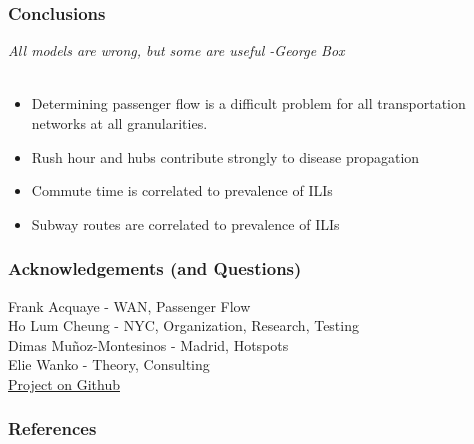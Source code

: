 \documentclass{beamer}
\begin{document}
\begin{frame}
\frametitle{Conclusions}
\textit{All models are wrong, but some are useful -George Box}\\~\\
\begin{itemize}
    \item Determining passenger flow is a difficult problem for all transportation networks at all granularities.
    \item Rush hour and hubs contribute strongly to disease propagation
    \item Commute time is correlated to prevalence of ILIs
    \item Subway routes are correlated to prevalence of ILIs
\end{itemize}
\end{frame}
\begin{frame}
\frametitle{Acknowledgements (and Questions)}
Frank Acquaye - WAN, Passenger Flow\\
Ho Lum Cheung - NYC, Organization, Research, Testing\\
Dimas Muñoz-Montesinos - Madrid, Hotspots\\
Elie Wanko - Theory, Consulting\\
\href{https://github.com/cheung-ho-lum/NS_Epidemics_ABM_Approach}{Project on Github}
\end{frame}
\begin{frame}[shrink=50]
\frametitle{References}


\end{frame}
\end{document}

